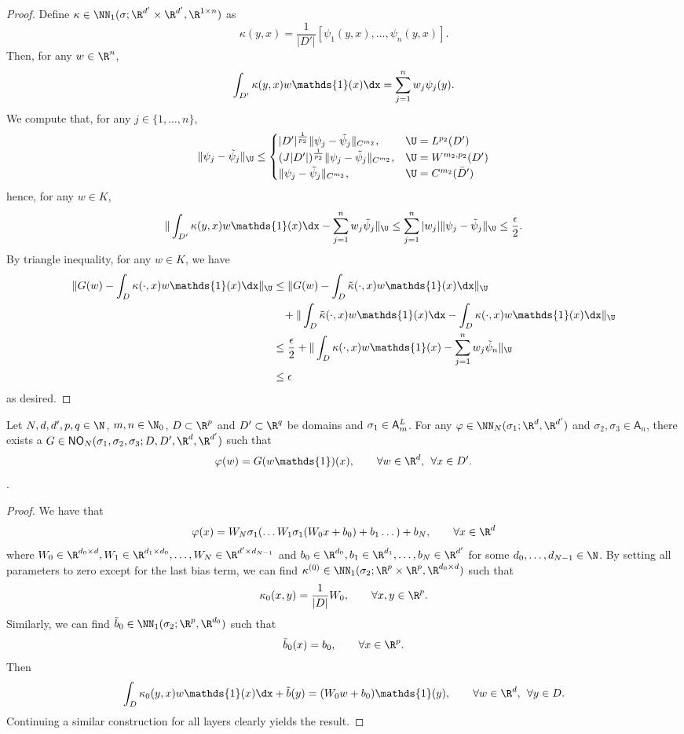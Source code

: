 \begin{proof}
Define \(\kappa \in \NN_1(\sigma;\R^{d'} \times \R^{d'},\R^{1 \times n})\) as
\[\kappa(y,x) = \frac{1}{|D'|}[\psi_1(y,x), \dots, \psi_n (y,x)].\]
Then, for any \(w \in \R^n\),
\[\int_{D'} \kappa(y,x) w \mathds{1}(x) \dx = \sum_{j=1}^nw_j \psi_j(y).\]
We compute that, for any \(j \in \{1,\dots,n\}\),
\[\|\psi_j - \tilde{\psi}_j\|_\U \leq \begin{cases}
|D'|^{\frac{1}{p_2}} \|\psi_j - \tilde{\psi}_j\|_{C^{m_2}}, & \U = L^{p_2}(D') \\
(J|D'|)^{\frac{1}{p_2}} \|\psi_j - \tilde{\psi}_j\|_{C^{m_2}}, & \U = W^{m_2,p_2}(D') \\
\|\psi_j - \tilde{\psi}_j\|_{C^{m_2}}, & \U = C^{m_2}(\bar{D}')
\end{cases}\]
hence, for any \(w \in K\),
\[\|\int_{D'} \kappa(y,x) w \mathds{1}(x) \dx - \sum_{j=1}^n w_j \tilde{\psi}_j \|_{\U} \leq \sum_{j=1}^n |w_j| \|\psi_j - \tilde{\psi}_j \|_\U \leq \frac{\epsilon}{2}.\]
By triangle inequality, for any \(w \in K\), we have
\begin{align*}
\|G(w) - \int_D \kappa(\cdot,x) w \mathds{1}(x) \dx\|_\U &\leq \|G(w) - \int_D \tilde{\kappa}(\cdot,x) w \mathds{1}(x) \dx\|_\U \\
&\:\:\:\: + \|\int_D \tilde{\kappa}(\cdot,x) w \mathds{1}(x) \dx - \int_D \kappa(\cdot,x) w \mathds{1}(x) \dx\|_\U \\
&\leq \frac{\epsilon}{2} + \|\int_D \kappa(\cdot,x) w \mathds{1}(x) -\sum_{j=1}^n w_j \tilde{\psi}_n \|_\U \\
&\leq \epsilon
\end{align*}
as desired.
\end{proof}

\begin{lemma}
\label{lemma:nn_emulation}
Let \(N, d, d', p, q \in \N\), \(m, n \in \N_0\), \(D \subset \R^p\) and \(D' \subset \R^q\) be domains and \(\sigma_1 \in \mathsf{A}^{\emph{\text{L}}}_m\). 
For any \(\varphi \in \NN_N (\sigma_1;\R^d, \R^{d'})\) and \(\sigma_2, \sigma_3 \in \mathsf{A}_n\), there exists a 
\(G \in \mathsf{NO}_N (\sigma_1,\sigma_2,\sigma_3;D,D',\R^d,\R^{d'})\) such that 
\[\varphi(w) = G(w \mathds{1})(x), \qquad \forall w \in \R^d, \:\: \forall x \in D'.\].
\end{lemma}
\begin{proof}
We have that
\[\varphi(x) = W_N \sigma_1 (\dots W_1 \sigma_1 (W_0x + b_0) + b_1 \dots ) + b_N, \qquad \forall x \in \R^d\]
where \(W_0 \in \R^{d_0 \times d}, W_1 \in \R^{d_1 \times d_0}, \dots, W_N \in \R^{d' \times d_{N-1}}\) and \(b_0 \in \R^{d_0}, b_1 \in \R^{d_1}, \dots,b_N \in \R^{d'}\)
for some \(d_0,\dots,d_{N-1} \in \N\). By setting all parameters to zero except for the last bias term, we can find 
\(\kappa^{(0)} \in \NN_1(\sigma_2;\R^p \times \R^p, \R^{d_0 \times d})\) such that
\[\kappa_0 (x,y) = \frac{1}{|D|} W_0, \qquad \forall x,y \in \R^p.\]
Similarly, we can find \(\tilde{b}_0 \in \NN_1(\sigma_2;\R^p, \R^{d_0})\)
such that
\[\tilde{b}_0 (x) = b_0, \qquad \forall x \in \R^p.\]
Then 
\[\int_D \kappa_0 (y,x) w \mathds{1}(x) \dx + \tilde{b}(y) = (W_0 w + b_0) \mathds{1}(y), \qquad \forall w \in \R^d, \:\: \forall y \in D.\]
Continuing a similar construction for all layers clearly yields the result.
\end{proof}

